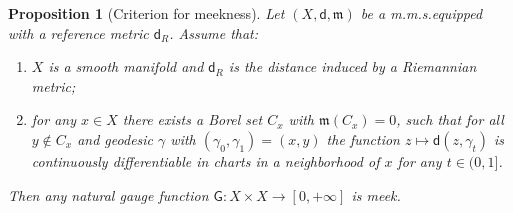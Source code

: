 \documentclass[11pt,a4paper]{article}
\theoremstyle{plain}
\newtheorem{proposition}[theorem]{Proposition}
\theoremstyle{definition}
\theoremstyle{remark}
\numberwithin{equation}{section}
\newcommand{\mm}{\mathfrak m}
\newcommand{\sfd}{\mathsf d}
\newcommand{\sfG}{\mathsf G}
\begin{document}
\begin{proposition}[Criterion for meekness]\label{p:meek1}
Let $(X,\sfd,\mm)$ be a m.m.s.\@ equipped with a reference metric $\sfd_R$. Assume that:
\begin{enumerate}[label = (\alph*)]
\item \label{i:meek11} $X$ is a smooth manifold and $\sfd_R$ is the distance induced by a Riemannian metric;
\item \label{i:meek12} for any $x \in X$ there exists a Borel set $C_x$ with $\mm(C_x)=0$, such that for all $y\notin C_x$ and geodesic $\gamma$ with $(\gamma_0,\gamma_1)=(x,y)$ the function $z\mapsto \sfd(z,\gamma_t)$ is continuously differentiable in charts in a neighborhood of $x$ for any $t\in (0,1]$.
\end{enumerate}
Then  any natural gauge function $\sfG:X\times X\to [0,+\infty]$ is meek.
\end{proposition}
\end{document}
